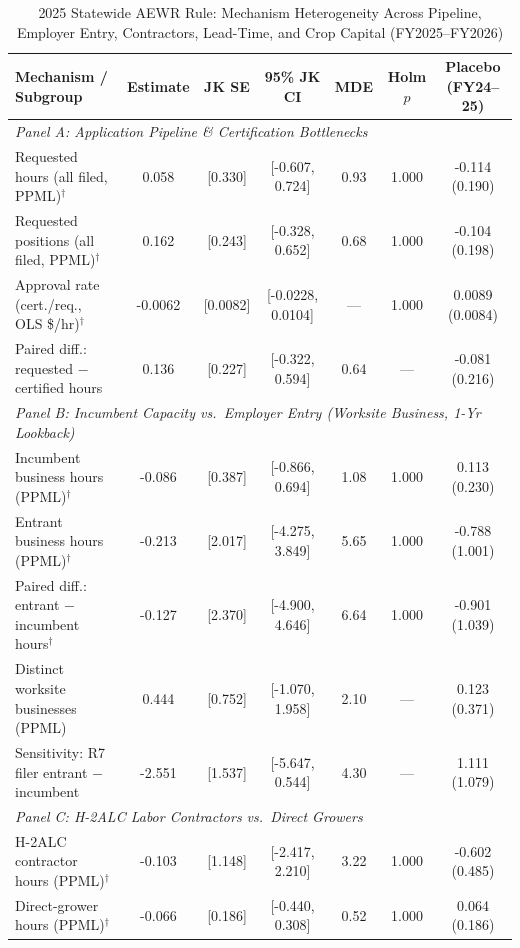 \begin{table}[!htbp]
\centering
\caption{2025 Statewide AEWR Rule: Mechanism Heterogeneity Across Pipeline, Employer Entry, Contractors, Lead-Time, and Crop Capital (FY2025--FY2026)}
\label{tab:policy_2025_mechanisms}
\small
\begin{tabular}{lcccccc}
\toprule
Mechanism / Subgroup & Estimate & JK SE & 95\% JK CI & MDE & Holm $p$ & Placebo (FY24--25) \\
\midrule
\multicolumn{7}{l}{\textit{Panel A: Application Pipeline \& Certification Bottlenecks}} \\
Requested hours (all filed, PPML)$^{\dagger}$ & 0.058 & [0.330] & [-0.607, 0.724] & 0.93 & 1.000 & -0.114 (0.190) \\
Requested positions (all filed, PPML)$^{\dagger}$ & 0.162 & [0.243] & [-0.328, 0.652] & 0.68 & 1.000 & -0.104 (0.198) \\
Approval rate (cert./req., OLS \$/hr)$^{\dagger}$ & -0.0062 & [0.0082] & [-0.0228, 0.0104] & --- & 1.000 & 0.0089 (0.0084) \\
Paired diff.: requested $-$ certified hours & 0.136 & [0.227] & [-0.322, 0.594] & 0.64 & --- & -0.081 (0.216) \\
\midrule
\multicolumn{7}{l}{\textit{Panel B: Incumbent Capacity vs.\ Employer Entry (Worksite Business, 1-Yr Lookback)}} \\
Incumbent business hours (PPML)$^{\dagger}$ & -0.086 & [0.387] & [-0.866, 0.694] & 1.08 & 1.000 & 0.113 (0.230) \\
Entrant business hours (PPML)$^{\dagger}$ & -0.213 & [2.017] & [-4.275, 3.849] & 5.65 & 1.000 & -0.788 (1.001) \\
Paired diff.: entrant $-$ incumbent hours$^{\dagger}$ & -0.127 & [2.370] & [-4.900, 4.646] & 6.64 & 1.000 & -0.901 (1.039) \\
Distinct worksite businesses (PPML) & 0.444 & [0.752] & [-1.070, 1.958] & 2.10 & --- & 0.123 (0.371) \\
Sensitivity: R7 filer entrant $-$ incumbent & -2.551 & [1.537] & [-5.647, 0.544] & 4.30 & --- & 1.111 (1.079) \\
\midrule
\multicolumn{7}{l}{\textit{Panel C: H-2ALC Labor Contractors vs.\ Direct Growers}} \\
H-2ALC contractor hours (PPML)$^{\dagger}$ & -0.103 & [1.148] & [-2.417, 2.210] & 3.22 & 1.000 & -0.602 (0.485) \\
Direct-grower hours (PPML)$^{\dagger}$ & -0.066 & [0.186] & [-0.440, 0.308] & 0.52 & 1.000 & 0.064 (0.186) \\

\end{tabular}
\end{table}
